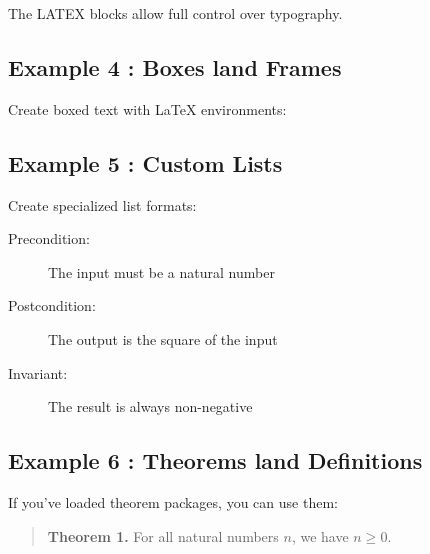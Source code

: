 \documentclass[a4paper,10pt,fleqn]{article}
\begin{document}
\noindent The LATEX blocks allow full control over typography.

\bigskip

\subsection*{Example 4 : Boxes land Frames}

\noindent Create boxed text with LaTeX environments:

\bigskip

\begin{center}


\end{center}

\subsection*{Example 5 : Custom Lists}

\noindent Create specialized list formats:

\bigskip

\begin{description}

\item[Precondition:] The input must be a natural number

\item[Postcondition:] The output is the square of the input

\item[Invariant:] The result is always non-negative

\end{description}

\subsection*{Example 6 : Theorems land Definitions}

\noindent If you've loaded theorem packages, you can use them:

\bigskip

\begin{quotation}

\textbf{Theorem 1.} For all natural numbers $n$, we have $n \geq 0$.

\end{quotation}
\end{document}
